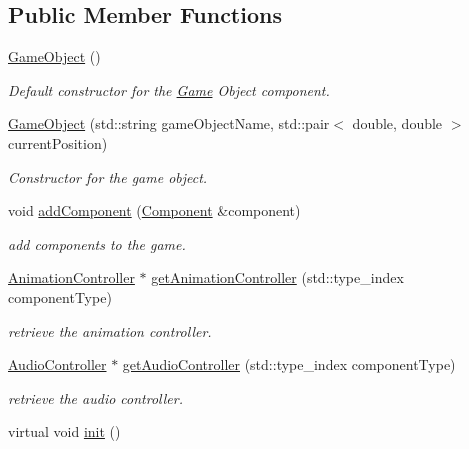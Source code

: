 \subsection*{Public Member Functions}
\begin{DoxyCompactItemize}
\item 
\hyperlink{classengine_1_1_game_object_a0348e3ee2e83d56eafca7a3547f432c4}{Game\+Object} ()
\begin{DoxyCompactList}\small\item\em Default constructor for the \hyperlink{classengine_1_1_game}{Game} Object component. \end{DoxyCompactList}\item 
\hyperlink{classengine_1_1_game_object_a55a9b8b92185ade1c96bac19b10f72ef}{Game\+Object} (std\+::string game\+Object\+Name, std\+::pair$<$ double, double $>$ current\+Position)
\begin{DoxyCompactList}\small\item\em Constructor for the game object. \end{DoxyCompactList}\item 
void \hyperlink{classengine_1_1_game_object_ab0358466033307401a6a0714184503d3}{add\+Component} (\hyperlink{classengine_1_1_component}{Component} \&component)
\begin{DoxyCompactList}\small\item\em add components to the game. \end{DoxyCompactList}\item 
\hyperlink{classengine_1_1_animation_controller}{Animation\+Controller} $\ast$ \hyperlink{classengine_1_1_game_object_a2ed6ce8eadeb37e2eea4f95eaa82b4e4}{get\+Animation\+Controller} (std\+::type\+\_\+index component\+Type)
\begin{DoxyCompactList}\small\item\em retrieve the animation controller. \end{DoxyCompactList}\item 
\hyperlink{classengine_1_1_audio_controller}{Audio\+Controller} $\ast$ \hyperlink{classengine_1_1_game_object_ae14d1f2f05718d3f1e127c81adf6cb36}{get\+Audio\+Controller} (std\+::type\+\_\+index component\+Type)
\begin{DoxyCompactList}\small\item\em retrieve the audio controller. \end{DoxyCompactList}\item 
virtual void \hyperlink{classengine_1_1_game_object_a9b565e5ec63bef28e5c860f724d2de7c}{init} ()

\end{DoxyCompactItemize}
